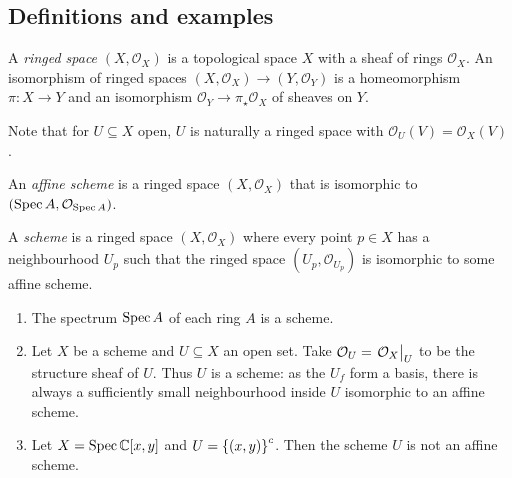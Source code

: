 \subsection{Definitions and examples}
\begin{definition}
    A \emph{ringed space} \( (X, \mathcal O_X) \) is a topological space \( X \) with a sheaf of rings \( \mathcal O_X \).
    An isomorphism of ringed spaces \( (X, \mathcal O_X) \to (Y, \mathcal O_Y) \) is a homeomorphism \( \pi : X \to Y \) and an isomorphism \( \mathcal O_Y \to \pi_\star \mathcal O_X \) of sheaves on \( Y \).
\end{definition}
Note that for \( U \subseteq X \) open, \( U \) is naturally a ringed space with \( \mathcal O_U(V) = \mathcal O_X(V) \).
\begin{definition}
    An \emph{affine scheme} is a ringed space \( (X, \mathcal O_X) \) that is isomorphic to \( (\operatorname{Spec} A, \mathcal O_{\operatorname{Spec} A}) \).
\end{definition}
\begin{definition}
    A \emph{scheme} is a ringed space \( (X, \mathcal O_X) \) where every point \( p \in X \) has a neighbourhood \( U_p \) such that the ringed space \( (U_p, \mathcal O_{U_p}) \) is isomorphic to some affine scheme.
\end{definition}
\begin{example}
    \begin{enumerate}
        \item The spectrum \( \operatorname{Spec} A \) of each ring \( A \) is a scheme.
        \item Let \( X \) be a scheme and \( U \subseteq X \) an open set.
        Take \( \mathcal O_U = \eval{\mathcal O_X}_U \) to be the structure sheaf of \( U \).
        Thus \( U \) is a scheme: as the \( U_f \) form a basis, there is always a sufficiently small neighbourhood inside \( U \) isomorphic to an affine scheme.
        \item Let \( X = \operatorname{Spec} \mathbb C[x, y] \) and \( U = \qty{(x, y)}^c \).
        Then the scheme \( U \) is not an affine scheme.
    \end{enumerate}
\end{example}
